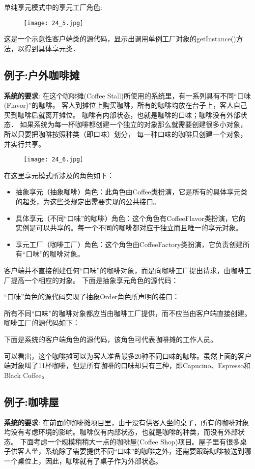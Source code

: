 \documentclass[../main.tex]{subfiles}
\begin{document}
单纯享元模式中的享元工厂角色:
%
\begin{figure}[H]
  \texttt{[image: 24\_5.jpg]}
\end{figure}
%
这是一个示意性客户端类的源代码，显示出调用单例工厂对象的getInstance()方法，以得到具体享元类．
%

%
\subsection{例子:户外咖啡摊}
\textbf{系统的要求}:
在这个咖啡摊(Coffee Stall)所使用的系统里，有一系列具有不同“口味(Flavor)”的咖啡。
客人到摊位上购买咖啡，所有的咖啡均放在台子上，客人自己买到咖啡后就离开摊位。
咖啡有内部状态，也就是咖啡的口味；咖啡没有外部状态．
如果系统为每一杯咖啡都创建一个独立的对象那么就需要创建很多小对象，所以只要把咖啡按照种类（即口味）划分，
每一种口味的咖啡只创建一个对象，并实行共享。
%
\begin{figure}[H]
  \texttt{[image: 24\_6.jpg]}
\end{figure}
%
在这里享元模式所涉及的角色如下：
\begin{itemize}
  \item 抽象享元（抽象咖啡）角色：此角色由Coffee类扮演，它是所有的具体享元类的超类，为这些类规定出需要实现的公共接口。
  \item 具体享元（不同“口味”的咖啡）角色：这个角色有CoffeeFlavor类扮演，它的实例是可以共享的。每一个不同的咖啡都对应于独立而且唯一的享元对象。
  \item 享元工厂（咖啡工厂）角色：这个角色由CoffeeFactory类扮演，它负责创建所有“口味”的咖啡对象。
\end{itemize}
%
客户端并不直接创建任何“口味”的咖啡对象，而是向咖啡工厂提出请求，由咖啡工厂提高一个相应的对象。
下面是抽象享元角色的源代码：
%

%
“口味”角色的源代码实现了抽象Order角色所声明的接口：
%

%
所有不同“口味”的咖啡对象都应当由咖啡工厂提供，而不应当由客户端直接创建。咖啡工厂的源代码如下：
%

%
下面是系统的客户端角色的源代码，该角色可代表咖啡摊的工作人员。
%

%
可以看出，这个咖啡摊可以为客人准备最多20种不同口味的咖啡。虽然上面的客户端对象叫了11杯咖啡，但是所有咖啡的口味却只有三种，即Capucino、Espresso和Black Coffee。
%
\subsection{例子:咖啡屋}
\textbf{系统的要求}:
在前面的咖啡摊项目里，由于没有供客人坐的桌子，所有的咖啡对象均没有考虑环境的影响。咖啡仅有内部状态，也就是咖啡的种类，而没有外部状态。
下面考虑一个规模稍稍大一点的咖啡屋(Coffee Shop)项目。屋子里有很多桌子供客人坐，系统除了需要提供不同“口味”的咖啡之外，还需要跟踪咖啡被送到哪一个桌位上，因此，咖啡就有了桌子作为外部状态。
\end{document}
